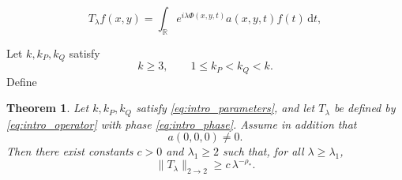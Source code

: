 \documentclass[10pt,a4paper]{amsart}
\newtheorem{theorem}{Theorem}
\begin{document}
    \begin{equation}\label{eq:intro_operator}
    T_\lambda f(x,y)=
    \int_{\mathbb R}
    e^{i\lambda \Phi(x,y,t)}
    a(x,y,t)f(t)\,\mathrm dt,
    \end{equation}

		Let \(k,k_P,k_Q\) satisfy \begin{equation}\label{eq:intro_parameters}
		k\ge 3,\qquad 1\le k_P<k_Q<k.	
	\end{equation} Define

	\begin{theorem}\label{thm:lbound}
		Let \(k,k_P,k_Q\) satisfy \eqref{eq:intro_parameters}, and let \(T_\lambda\) be defined by
		\eqref{eq:intro_operator} with phase \eqref{eq:intro_phase}.  Assume in addition that
		\begin{equation*}
			a(0,0,0)\neq 0.
		\end{equation*}
		Then there exist constants \(c>0\) and \(\lambda_1\ge2\) such that, for all \(\lambda\ge\lambda_1\),
		\begin{equation}\label{eq:lowerbound_main}
			\|T_\lambda\|_{2\to2}
			\ge c\,\lambda^{-\rho_*}.
		\end{equation}
	\end{theorem}
\end{document}
